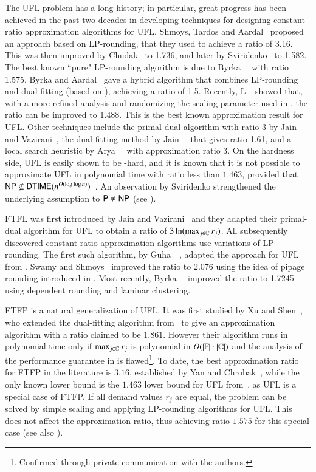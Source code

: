 The UFL problem has a long history; in particular, great
progress has been achieved in the past two decades in
developing techniques for designing constant-ratio
approximation algorithms for UFL.  Shmoys, Tardos and
Aardal~\cite{ShmoysTA97} proposed an approach based on
LP-rounding, that they used to achieve a ratio of 3.16.
This was then improved by Chudak~\cite{ChudakS04} to 1.736,
and later by Sviridenko~\cite{Svi02} to 1.582.
The best known ``pure" LP-rounding algorithm is due to
Byrka~{\etal}~\cite{ByrkaGS10} with ratio 1.575. 
Byrka and Aardal~\cite{ByrkaA10} gave a hybrid algorithm that combines LP-rounding
and dual-fitting (based on \cite{JainMMSV03}), achieving a ratio of 1.5.  Recently,
Li~\cite{Li11} showed that, with a more refined analysis and
randomizing the scaling parameter used in \cite{ByrkaA10}, the ratio can be improved
to 1.488. This is the best known approximation result for UFL.  
Other techniques include the primal-dual algorithm with ratio 3 by
Jain and Vazirani~\cite{JainV01}, the dual fitting method by
Jain~{\etal}~\cite{JainMMSV03} that gives ratio 1.61, and a
local search heuristic by Arya~{\etal}~\cite{AryaGKMMP04}
with approximation ratio 3.  On the hardness side, UFL is
easily shown to be {\NP}-hard, and it is known that it is
not possible to approximate UFL in polynomial time with
ratio less than $1.463$, provided that
${\mbox{\sf NP}}\not\subseteq{\mbox{\sf DTIME}}(n^{O(\log\log
  n)})$~\cite{GuhaK98}. An observation by Sviridenko
strengthened the underlying assumption to ${\mbox{\sf P}}\ne {\mbox{\sf NP}}$ (see \cite{vygen05}).

FTFL was first introduced by Jain and
Vazirani~\cite{JainV03} and they adapted their primal-dual
algorithm for UFL to obtain a ratio of
$3\ln(\max_{j\in\mathbb{C}}r_j)$.  All subsequently
discovered constant-ratio approximation algorithms use
variations of LP-rounding.  The first such algorithm, by
Guha~{\etal}~\cite{GuhaMM01}, adapted the approach for UFL
from \cite{ShmoysTA97}.  Swamy and Shmoys~\cite{SwamyS08}
improved the ratio to $2.076$ using the idea of pipage
rounding introduced in \cite{Svi02}. Most recently,
Byrka~{\etal}~\cite{ByrkaSS10} improved the ratio to 1.7245
using dependent rounding and laminar clustering.

FTFP is a natural generalization of UFL. It was first
studied by Xu and Shen~\cite{XuS09}, who extended the
dual-fitting algorithm from~\cite{JainMMSV03} to give an
approximation algorithm with a ratio claimed to be
$1.861$. However their algorithm runs in polynomial time
only if $\max_{j\in\mathbb{C}} r_j$ is polynomial in
$O(|\mathbb{F}|\cdot |\mathbb{C}|)$ and the analysis of the
performance guarantee in \cite{XuS09} is flawed\footnote{Confirmed through
  private communication with the authors.}.  To date, the
best approximation ratio for FTFP in the literature is $3.16$,
established by Yan and Chrobak~\cite{YanC11}, while the only
known lower bound is the $1.463$ lower bound for UFL
from~\cite{GuhaK98}, as UFL is a special case of FTFP.
If all demand values $r_j$ are equal, the problem can be solved
by simple scaling and applying LP-rounding algorithms for UFL. This does
not affect the approximation ratio, thus achieving ratio $1.575$ for this
special case (see also \cite{LiaoShen11}).

